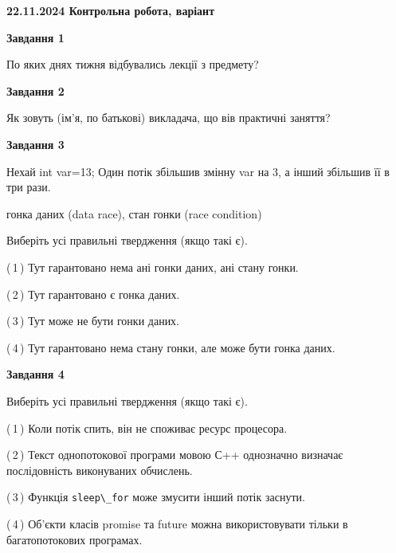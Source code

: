 \documentclass[12pt, ukrainian]{article}
\def\code#1{\Verb!#1!}
\begin{document}
\begin {large}

\textbf{22.11.2024 Контрольна робота, варіант  }\par


{

\begin{center}
\textbf{Завдання 1}
\end{center}

По яких днях тижня відбувались лекції з предмету?


\begin{center}
\textbf{Завдання 2}
\end{center}

Як зовуть (ім'я, по батькові) викладача, що вів практичні заняття?


\begin{center}
\textbf{Завдання 3}
\end{center}

Нехай int var=13; Один потік збільшив змінну var на 3, а інший збільшив її в три рази.

гонка даних (data race), стан гонки (race condition)

Виберіть усі правильні твердження (якщо такі є).\par
\vspace{2mm}
(\,1\,) Тут гарантовано нема ані гонки даних, ані стану гонки.%

(\,2\,) Тут гарантовано є гонка даних.%

(\,3\,) Тут може не бути гонки даних.%

(\,4\,) Тут гарантовано нема стану гонки, але може бути гонка даних.%


\begin{center}
\textbf{Завдання 4}
\end{center}

Виберіть усі правильні твердження (якщо такі є).\par
\vspace{2mm}

(\,1\,) Коли потік спить, він не споживає ресурс процесора.%

(\,2\,) Текст однопотокової програми мовою С++ однозначно визначає послідовність виконуваних обчислень.%

(\,3\,) Функція \code{sleep\_for} може змусити інший потік заснути.%

(\,4\,) Об’єкти класів promise та future можна використовувати тільки в багатопотокових програмах.%


}
\end{large}
\end{document}
